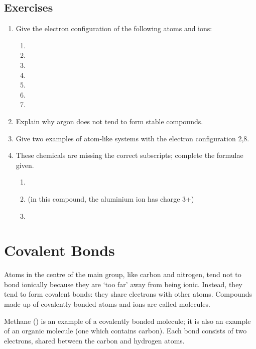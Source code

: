 \documentclass[a4paper]{memoir}
\begin{document}
\subsection*{Exercises}
\begin{enumerate}
  \item Give the electron configuration of the following atoms and ions:
    \begin{enumerate}
      \item {}
      \item {}
      \item {}
      \item {}
      \item {}
      \item {}
      \item {}
    \end{enumerate}
  \item Explain why argon does not tend to form stable compounds.
  \item Give two examples of atom-like systems with the electron configuration 2,8.
  \item These chemicals are missing the correct subscripts; complete the formulae given.
    \begin{enumerate}
      \item {}
      \item {} (in this compound, the aluminium ion has charge 3+)
      \item {}
    \end{enumerate}
\end{enumerate}

\section{Covalent Bonds}
Atoms in the centre of the main group, like carbon and nitrogen, tend not to bond ionically because they are `too far' away from being ionic.
Instead, they tend to form covalent bonds: they share electrons with other atoms. Compounds made up of covalently bonded atoms and ions are
called molecules.

\begin{center}
\end{center}

Methane () is an example of a covalently bonded molecule; it is also an example of an organic molecule (one which contains carbon). Each
bond consists of two electrons, shared between the carbon and hydrogen atoms.
\end{document}
